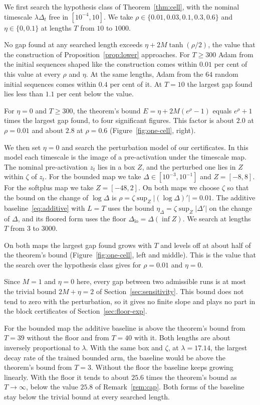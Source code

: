 \documentclass[11pt, a4paper]{article}
\theoremstyle{remark}
\theoremstyle{plain}
\begin{document}
We first search the hypothesis class of Theorem~\ref{thm:cell}, with the nominal timescale
$\lambda\Delta_t$ free in $[10^{-4}, 10]$. We take $\rho \in \{0.01, 0.03, 0.1, 0.3, 0.6\}$ and
$\eta \in \{0, 0.1\}$ at lengths $T$ from $10$ to $1000$.

No gap found at any searched length exceeds $\eta + 2M\tanh(\rho/2)$, the value that the
construction of Proposition~\ref{prop:lower} approaches. For $T \ge 300$ Adam from the initial sequences shaped
like the construction comes within $0.01$ per cent of this value at every $\rho$ and $\eta$. At the same
lengths, Adam from the $64$ random initial sequences comes within $0.4$ per cent of it. At $T = 10$ the
largest gap found lies less than $1.1$ per cent below the value.

For $\eta = 0$ and $T \ge 300$, the theorem's bound $E = \eta + 2M(e^{\rho} - 1)$ equals $e^{\rho} + 1$ times the largest gap found, to four significant figures. This factor
is about $2.0$ at $\rho = 0.01$ and about $2.8$ at $\rho = 0.6$ (Figure~\ref{fig:one-cell},
right).

We then set $\eta = 0$ and search the perturbation model of our certificates. In this model each
timescale is the image of a pre-activation under the timescale map. The nominal pre-activation
$z_t$ lies in a box $Z$, and the perturbed one lies in $Z$ within $\zeta$ of $z_t$. For the
bounded map we take $\Delta \in [10^{-3}, 10^{-1}]$ and $Z = [-8, 8]$. For the softplus map we
take $Z = [-48, 2]$. On both maps we choose $\zeta$ so that the bound on the change of $\log\Delta$
is $\rho = \zeta\sup_Z|(\log\Delta)'| = 0.01$. The additive baseline~\eqref{eq:additive} with
$L = T$ uses the bound $\eta_\Delta = \zeta\sup_Z|\Delta'|$ on the change of $\Delta$, and its
floored form uses the floor $\Delta_{\mathrm{lo}} = \Delta(\inf Z)$. We search at lengths $T$ from
$3$ to $3000$.

On both maps the largest gap found grows with $T$ and levels off at about half of the theorem's
bound (Figure~\ref{fig:one-cell}, left and middle). This is the value that the search over the
hypothesis class gives for $\rho = 0.01$ and $\eta = 0$.

Since $M = 1$ and $\eta = 0$ here, every gap between two admissible runs is at most the
trivial bound $2M + \eta = 2$ of Section~\ref{sec:sensitivity}. This bound does not tend to zero
with the perturbation, so it gives no finite slope and plays no part in the block certificates of
Section~\ref{sec:floor-exp}.

For the bounded map the additive baseline is above the theorem's bound from $T = 39$ without the
floor and from $T = 40$ with it. Both lengths are about inversely proportional to $\lambda$. With
the same box and $\zeta$, at $\lambda = 17.14$, the largest decay rate of the trained bounded arm,
the baseline would be above the theorem's bound from $T = 3$. Without the floor the baseline keeps
growing linearly. With the floor it
tends to about $25.6$ times the theorem's bound as $T \to \infty$, below the value $25.8$ of
Remark~\ref{rem:cap}. Both forms of the baseline stay below the trivial bound at every searched
length.
\end{document}
